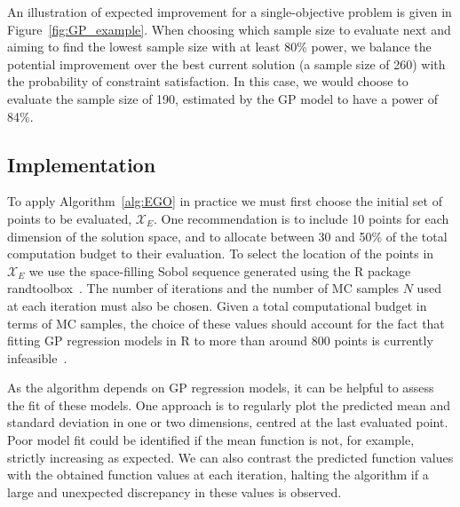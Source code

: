 \documentclass[sagev]{sagej}
\begin{document}
An illustration of expected improvement for a single-objective problem is given in Figure~\ref{fig:GP_example}. When choosing which sample size to evaluate next and aiming to find the lowest sample size with at least 80\% power, we balance the potential improvement over the best current solution (a sample size of 260) with the probability of constraint satisfaction. In this case, we would choose to evaluate the sample size of 190, estimated by the GP model to have a power of 84\%.


\subsection{Implementation}

To apply Algorithm~\ref{alg:EGO} in practice we must first choose the initial set of points to be evaluated, $\mathcal{X}_{E}$. One recommendation is to include 10 points for each dimension of the solution space, and to allocate between 30 and 50\% of the total computation budget to their evaluation\cite{Picheny2010}. To select the location of the points in $\mathcal{X}_{E}$ we use the space-filling Sobol sequence generated using the R package randtoolbox~\cite{Dutang2015}. The number of iterations and the number of MC samples $N$ used at each iteration must also be chosen. Given a total computational budget in terms of MC samples, the choice of these values should account for the fact that fitting GP regression models in R to more than around 800 points is currently infeasible~\cite{Chevalier2014}. 

As the algorithm depends on GP regression models, it can be helpful to assess the fit of these models. One approach is to regularly plot the predicted mean and standard deviation in one or two dimensions, centred at the last evaluated point. Poor model fit could be identified if the mean function is not, for example, strictly increasing as expected. We can also contrast the predicted function values with the obtained function values at each iteration, halting the algorithm if a large and unexpected discrepancy in these values is observed.
\end{document}
